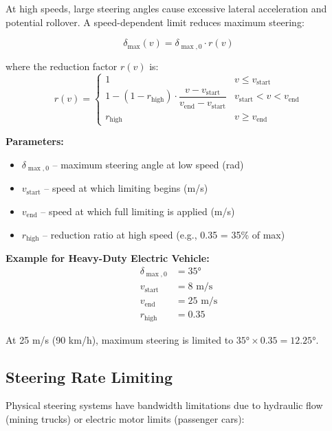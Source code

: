 \documentclass[11pt,a4paper]{article}
\begin{document}
At high speeds, large steering angles cause excessive lateral acceleration and potential rollover. A speed-dependent limit reduces maximum steering:

\begin{equation}
\delta_{\max}(v) = \delta_{\max,0} \cdot r(v)
\end{equation}

where the reduction factor $r(v)$ is:
\begin{equation}
\boxed{r(v) = \begin{cases}
1 & v \leq v_{\text{start}} \\
1 - (1 - r_{\text{high}}) \cdot \dfrac{v - v_{\text{start}}}{v_{\text{end}} - v_{\text{start}}} & v_{\text{start}} < v < v_{\text{end}} \\
r_{\text{high}} & v \geq v_{\text{end}}
\end{cases}}
\label{eq:speed_steering_limit}
\end{equation}

\textbf{Parameters:}
\begin{itemize}
    \item $\delta_{\max,0}$ -- maximum steering angle at low speed (rad)
    \item $v_{\text{start}}$ -- speed at which limiting begins (m/s)
    \item $v_{\text{end}}$ -- speed at which full limiting is applied (m/s)
    \item $r_{\text{high}}$ -- reduction ratio at high speed (e.g., 0.35 = 35\% of max)
\end{itemize}

\textbf{Example for Heavy-Duty Electric Vehicle:}
\begin{align}
\delta_{\max,0} &= 35° \\
v_{\text{start}} &= 8 \text{ m/s} \\
v_{\text{end}} &= 25 \text{ m/s} \\
r_{\text{high}} &= 0.35
\end{align}

At 25 m/s (90 km/h), maximum steering is limited to $35° \times 0.35 = 12.25°$.

\subsection{Steering Rate Limiting}

Physical steering systems have bandwidth limitations due to hydraulic flow (mining trucks) or electric motor limits (passenger cars):
\end{document}
